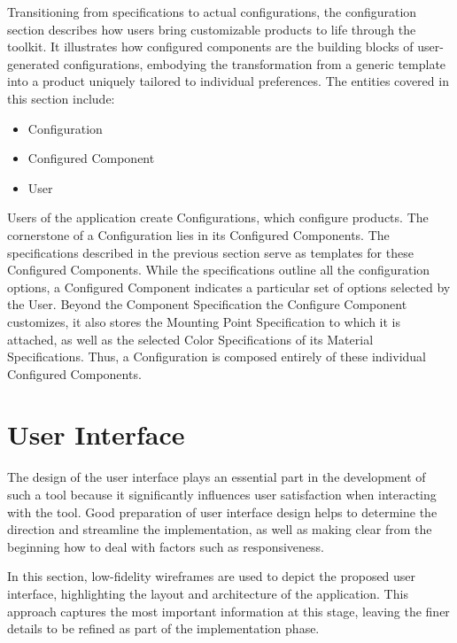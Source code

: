 Transitioning from specifications to actual configurations, the configuration section describes how users bring customizable products to life through the toolkit.
It illustrates how configured components are the building blocks of user-generated configurations, embodying the transformation from a generic template into a product uniquely tailored to individual preferences.
The entities covered in this section include:
\begin{itemize}[label=\rectanglebullet]
    \item Configuration
    \item Configured Component
    \item User
\end{itemize}

Users of the application create Configurations, which configure products. The cornerstone of a Configuration lies in its Configured Components. The specifications described in the previous section serve as templates for these Configured Components. While the specifications outline all the configuration options, a Configured Component indicates a particular set of options selected by the User. Beyond the Component Specification the Configure Component customizes, it also stores the Mounting Point Specification to which it is attached, as well as the selected Color Specifications of its Material Specifications. Thus, a Configuration is composed entirely of these individual Configured Components.


\section{User Interface} \label{section:wireframes}

The design of the user interface plays an essential part in the development of such a tool because it significantly influences user satisfaction when interacting with the tool. Good preparation of user interface design helps to determine the direction and streamline the implementation, as well as making clear from the beginning how to deal with factors such as responsiveness.

In this section, low-fidelity wireframes are used to depict the proposed user interface, highlighting the layout and architecture of the application. This approach captures the most important information at this stage, leaving the finer details to be refined as part of the implementation phase.

